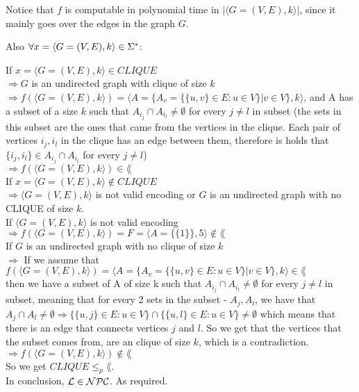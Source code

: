 Notice that $f$ is computable in polynomial time in $|\langle G=(V,E), k \rangle|$, since it mainly goes over the edges in the graph $G$.

Also $\forall x = \langle G=(V,E), k \rangle \in \Sigma^*$:

If $x = \langle G=(V,E), k \rangle \in CLIQUE$ \\
$\Rightarrow G$ is an undirected graph with clique of size $k$ \\
$\Rightarrow f(\langle G=(V,E), k \rangle) = \langle A=\{A_v = \{\{u,v\} \in E: u \in V\} | v \in V\}, k \rangle$, and A has a subset
of a size $k$ such that $A_{i_j} \cap A_{i_l} \neq \emptyset$ for every $j \neq l$ in subset (the sets in this subset are the ones that came from the vertices in the clique.
Each pair of vertices $i_j,i_l$ in the clique has an edge between them, therefore is holds that $\{i_j, i_l\} \in A_{i_j} \cap A_{i_l}$ for every $j \neq l$) \\
$\Rightarrow f(\langle G=(V,E), k \rangle) \in \lang$ \\

If $x = \langle G=(V,E), k \rangle \notin CLIQUE$ \\
$\Rightarrow \langle G=(V,E), k \rangle$ is not valid encoding or $G$ is an undirected graph with no CLIQUE of size $k$. \\
If $\langle G=(V,E), k \rangle$ is not valid encoding \\
$\Rightarrow f(\langle G=(V,E), k \rangle) = F = \langle A=\{\{1\}\}, 5 \rangle \notin \lang$ \\
If $G$ is an undirected graph with no clique of size $k$ \\
$\Rightarrow $ If we assume that $f(\langle G=(V,E), k \rangle) = \langle A=\{A_v = \{\{u,v\} \in E: u \in V\} | v \in V\}, k \rangle \in \lang$ \\
then we have a subset of A of size k such that $A_{i_j} \cap A_{i_l} \neq \emptyset$ for every $j \neq l$ in subset, meaning that for every 2 sets in the subset - $A_j, A_l$,
we have that $A_j \cap A_l \neq \emptyset \Rightarrow \{\{u,j\} \in E: u \in V\} \cap \{\{u,l\} \in E: u \in V\} \neq \emptyset$
which means that there is an edge that connects vertices $j$ and $l$. So we get that the vertices that the subset comes from, are an
clique of size $k$, which is a contradiction. \\
$\Rightarrow f(\langle G=(V,E), k \rangle) \notin \lang$ \\

So we get \underline{$CLIQUE \leq_p \lang$}. \\
In conclusion, $\mathcal{L} \in \mathcal{N}\mathcal{P}\mathcal{C}$. As required.
